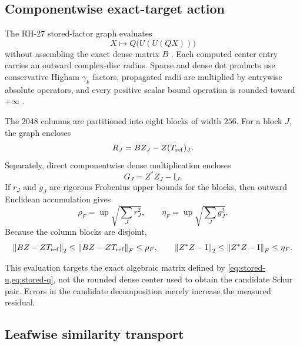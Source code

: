 \documentclass[11pt]{article}
\theoremstyle{definition}
\theoremstyle{remark}
\newcommand{\Id}{\mathrm I}
\newcommand{\norm}[1]{\left\lVert#1\right\rVert}
\newcommand{\Tref}{T_{\rm ref}}
\begin{document}
\subsection{Componentwise exact-target action}

The RH-27 stored-factor graph evaluates
\begin{equation}
 X\longmapsto Q\bigl(U(U(QX))\bigr)
 \label{eq:factor-action}
\end{equation}
without assembling the exact dense matrix \(B\)
\citep{WangOutwardCode2026}.  Each computed center entry carries an outward
complex-disc radius.  Sparse and dense dot products use conservative
Higham \(\gamma_k\) factors, propagated radii are multiplied by entrywise
absolute operators, and every positive scalar bound operation is rounded
toward \(+\infty\) \citep{Higham2002,Rump2010}.

The \(2048\) columns are partitioned into eight blocks of width \(256\).
For a block \(J\), the graph encloses
\begin{equation}
 R_J=BZ_J-Z(\Tref)_J.
 \label{eq:block-residual}
\end{equation}
Separately, direct componentwise dense multiplication encloses
\begin{equation}
 G_J=Z^*Z_J-\Id_J.
 \label{eq:block-gram}
\end{equation}
If \(r_J\) and \(g_J\) are rigorous Frobenius upper bounds for the blocks,
then outward Euclidean accumulation gives
\begin{equation}
 \rho_F=
 \operatorname{up}\sqrt{\sum_J r_J^2},
 \qquad
 \eta_F=
 \operatorname{up}\sqrt{\sum_J g_J^2}.
 \label{eq:block-combination}
\end{equation}
Because the column blocks are disjoint,
\[
 \norm{BZ-Z\Tref}_2\leq\norm{BZ-Z\Tref}_F\leq\rho_F,
 \qquad
 \norm{Z^*Z-\Id}_2\leq\norm{Z^*Z-\Id}_F\leq\eta_F.
\]

This evaluation targets the exact algebraic matrix defined by
\cref{eq:stored-u,eq:stored-q}, not the rounded dense center used to obtain
the candidate Schur pair.  Errors in the candidate decomposition merely
increase the measured residual.

\subsection{Leafwise similarity transport}
\end{document}
